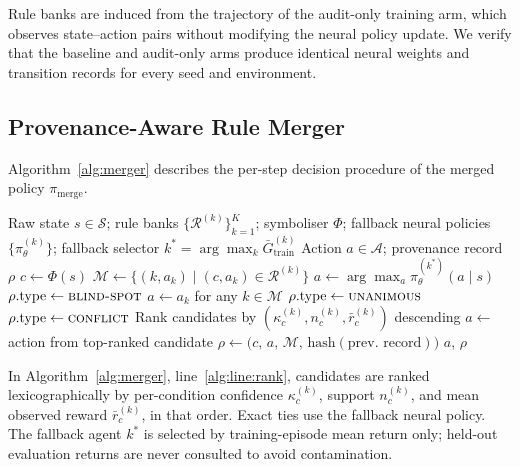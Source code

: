 \documentclass[12pt]{article}
\newcommand{\cS}{\mathcal{S}}       %
\newcommand{\cA}{\mathcal{A}}       %
\newcommand{\cR}{\mathcal{R}}       %
\newcommand{\piN}{\pi_{\theta}}     %
\begin{document}
Rule banks are induced from the trajectory of the audit-only training arm,
which observes state--action pairs without modifying the neural policy update.
We verify that the baseline and audit-only arms produce identical neural
weights and transition records for every seed and environment.

\subsection{Provenance-Aware Rule Merger}
\label{sec:method:merger}

Algorithm~\ref{alg:merger} describes the per-step decision procedure of the
merged policy $\pi_{\mathrm{merge}}$.

\begin{algorithm}[t]
\caption{Provenance-preserving rule merger}
\label{alg:merger}
\begin{algorithmic}[1]
\Require Raw state $s \in \cS$;
         rule banks $\{\cR^{(k)}\}_{k=1}^{K}$;
         symboliser $\Phi$;
         fallback neural policies $\{\piN^{(k)}\}$;
         fallback selector $k^* = \arg\max_k \bar{G}^{(k)}_{\mathrm{train}}$
\Ensure  Action $a \in \cA$; provenance record $\rho$
\State $c \leftarrow \Phi(s)$
\State $\mathcal{M} \leftarrow \{(k, a_k) \mid (c, a_k) \in \cR^{(k)}\}$
  \State $a \leftarrow \arg\max_a \piN^{(k^*)}(a \mid s)$
  \State $\rho.\mathrm{type} \leftarrow \textsc{blind-spot}$
  \State $a \leftarrow a_k$ for any $k \in \mathcal{M}$
  \State $\rho.\mathrm{type} \leftarrow \textsc{unanimous}$
\Else
  \State $\rho.\mathrm{type} \leftarrow \textsc{conflict}$
  \State Rank candidates by $(\kappa^{(k)}_c, n^{(k)}_c, \bar{r}^{(k)}_c)$
    descending \label{alg:line:rank}
  \State $a \leftarrow$ action from top-ranked candidate
\EndIf
\State $\rho \leftarrow \bigl(c,\, a,\, \mathcal{M},\,
  \mathrm{hash}(\text{prev. record})\bigr)$
\State \Return $a$, $\rho$
\end{algorithmic}
\end{algorithm}

In Algorithm~\ref{alg:merger}, line~\ref{alg:line:rank}, candidates are
ranked lexicographically by per-condition confidence $\kappa^{(k)}_c$,
support $n^{(k)}_c$, and mean observed reward $\bar{r}^{(k)}_c$, in that
order.
Exact ties use the fallback neural policy.
The fallback agent $k^*$ is selected by training-episode mean return only;
held-out evaluation returns are never consulted to avoid contamination.
\end{document}
